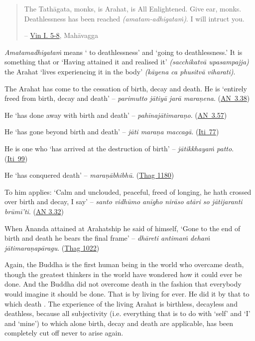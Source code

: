 \begin{quote}
The Tathāgata, monks, is Arahat, is All Enlightened. Give ear, monks. Deathlessness has been reached \emph{(amatam-adhigataṁ)}. I will intruct you.

 -- \href{https://suttacentral.net/pli-tv-kd1/en/brahmali}{Vin I. 5-8}, Mahāvagga
\end{quote}

\emph{Amatamadhigataṁ} means ` to deathlessness' and  `going to deathlessness.' It is something that  or  `Having attained it and realised it' \emph{(sacchikatvā upasampajja)} the Arahat `lives experiencing it in the body' \emph{(kāyena ca phusitvā viharati)}.

The Arahat has come to the cessation of birth, decay and death. He is `entirely freed from birth, decay and death' -- \emph{parimutto jātiyā jarā maraṇena}. (\href{https://suttacentral.net/an3.38/en/bodhi}{AN~3.38})

He `has done away with birth and death' -- \emph{pahīnajātimaraṇo}. (\href{https://suttacentral.net/an3.57/en/bodhi}{AN~3.57})

He `has gone beyond birth and death' -- \emph{jāti maraṇa maccagā}. (\href{https://suttacentral.net/iti77/en/sujato}{Iti~77})

He is one who `has arrived at the destruction of birth' -- \emph{jātikkhayaṁ patto}. (\href{https://suttacentral.net/iti99/en/sujato}{Iti~99})

He `has conquered death' -- \emph{maraṇābhibhū}. (\href{https://suttacentral.net/thag20.1/en/sujato}{Thag 1180})

To him applies: `Calm and unclouded, peaceful, freed of longing, he hath crossed over birth and decay, I say' -- \emph{santo vidhūmo anīgho nirāso atāri so jātijaranti brūmī'ti}. (\href{https://suttacentral.net/an3.32/en/bodhi}{AN 3.32})

When Ānanda attained at Arahatship he said of himself, `Gone to the end of birth and death he bears the final frame' -- \emph{dhāreti antimaṁ dehaṁ jātimaraṇapāragu}. (\href{https://suttacentral.net/thag17.3/en/sujato}{Thag 1022})

Again, the Buddha is the first human being in the world who overcame death, though the greatest thinkers in the world have wondered how it could ever be done. And the Buddha did not overcome death in the fashion that everybody would imagine it should be done. That is by living for ever. He did it by  that to which death . The experience of the living Arahat is birthless, decayless and deathless, because all subjectivity (i.e. everything that is to do with `self' and `I' and `mine') to which alone birth, decay and death are applicable, has been completely cut off never to arise again.

